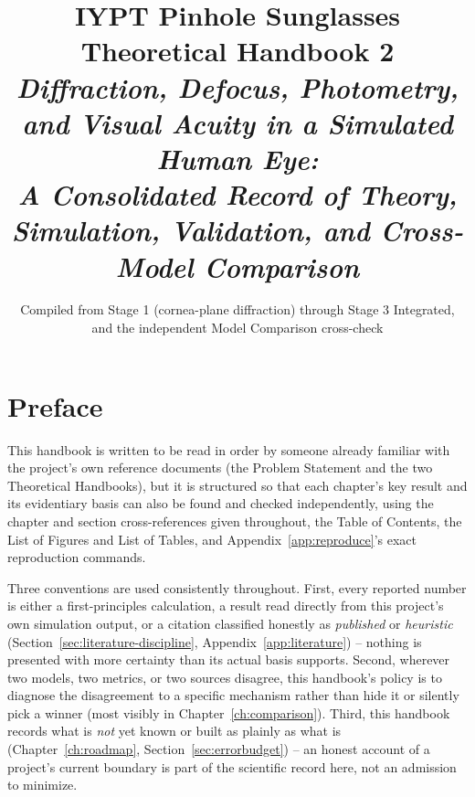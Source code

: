 \documentclass[11pt]{report}
\title{\textbf{\Huge IYPT Pinhole Sunglasses}\\[0.3cm]\textcolor{hbblue}{\huge Theoretical Handbook 2}\\[0.5cm]
\large\itshape Diffraction, Defocus, Photometry, and Visual Acuity in a Simulated Human Eye:\\
A Consolidated Record of Theory, Simulation, Validation, and Cross-Model Comparison}
\author{}
\date{Compiled from Stage 1 (cornea-plane diffraction) through Stage 3 Integrated,\\ and the independent Model Comparison cross-check}
\begin{document}
\maketitle
\tableofcontents
\listoffigures
\listoftables

\chapter*{Preface}
This handbook is written to be read in order by someone already familiar with the project's own reference documents (the Problem Statement and the two Theoretical Handbooks), but it is structured so that each chapter's key result and its evidentiary basis can also be found and checked independently, using the chapter and section cross-references given throughout, the Table of Contents, the List of Figures and List of Tables, and Appendix~\ref{app:reproduce}'s exact reproduction commands.

Three conventions are used consistently throughout. First, every reported number is either a first-principles calculation, a result read directly from this project's own simulation output, or a citation classified honestly as \emph{published} or \emph{heuristic} (Section~\ref{sec:literature-discipline}, Appendix~\ref{app:literature}) -- nothing is presented with more certainty than its actual basis supports. Second, wherever two models, two metrics, or two sources disagree, this handbook's policy is to diagnose the disagreement to a specific mechanism rather than hide it or silently pick a winner (most visibly in Chapter~\ref{ch:comparison}). Third, this handbook records what is \emph{not} yet known or built as plainly as what is (Chapter~\ref{ch:roadmap}, Section~\ref{sec:errorbudget}) -- an honest account of a project's current boundary is part of the scientific record here, not an admission to minimize.
\end{document}
